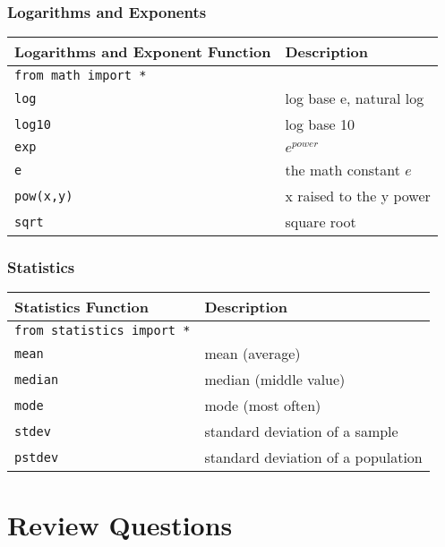 \documentclass{book}
\newcommand{\passthrough}[1]{#1}
\begin{document}
\hypertarget{logarithms-and-exponents}{%
\subsubsection{Logarithms and
Exponents}\label{logarithms-and-exponents}}

\begin{longtable}[]{@{}ll@{}}
\toprule
Logarithms and Exponent Function & Description\tabularnewline
\midrule
\endhead
\passthrough{\lstinline!from math import *!} &\tabularnewline
\passthrough{\lstinline!log!} & log base e, natural log\tabularnewline
\passthrough{\lstinline!log10!} & log base 10\tabularnewline
\passthrough{\lstinline!exp!} & \(e^{power}\)\tabularnewline
\passthrough{\lstinline!e!} & the math constant \(e\)\tabularnewline
\passthrough{\lstinline!pow(x,y)!} & x raised to the y
power\tabularnewline
\passthrough{\lstinline!sqrt!} & square root\tabularnewline
\bottomrule
\end{longtable}

\hypertarget{statistics}{%
\subsubsection{Statistics}\label{statistics}}

\begin{longtable}[]{@{}ll@{}}
\toprule
Statistics Function & Description\tabularnewline
\midrule
\endhead
\passthrough{\lstinline!from statistics import *!} &\tabularnewline
\passthrough{\lstinline!mean!} & mean (average)\tabularnewline
\passthrough{\lstinline!median!} & median (middle value)\tabularnewline
\passthrough{\lstinline!mode!} & mode (most often)\tabularnewline
\passthrough{\lstinline!stdev!} & standard deviation of a
sample\tabularnewline
\passthrough{\lstinline!pstdev!} & standard deviation of a
population\tabularnewline
\bottomrule
\end{longtable}
    




    
        \hypertarget{review-questions}{%
\section{Review Questions}\label{review-questions}}
    
\end{document}
